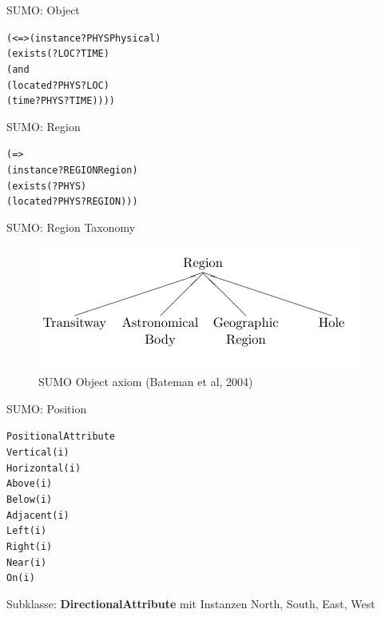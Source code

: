 \documentclass[12pt,a4paper]{beamer}
\begin{document}
\begin{frame}{SUMO: Object}
\begin{alltt}

(<=> (instance ?PHYS Physical)\\
    (exists (?LOC ?TIME)\\
    (and\\
    (located ?PHYS ?LOC)\\
    (time ?PHYS ?TIME))))\\

\end{alltt}

\end{frame}




\begin{frame}{SUMO: Region}
\begin{alltt}
(=>
    (instance ?REGION Region)\\
    (exists (?PHYS)\\
    (located ?PHYS ?REGION)))\\
\end{alltt}
\end{frame}



\begin{frame}{SUMO: Region Taxonomy}
\begin{figure}
\includegraphics[scale=0.45]{img/d2_region_taxonomy.png}
\caption{SUMO Object axiom (Bateman et al, 2004)}
\end{figure}
\end{frame}

\begin{frame}{SUMO: Position}
\begin{alltt}
PositionalAttribute\\
    Vertical(i)\\
    Horizontal(i)\\
    Above(i)\\
    Below(i)\\
    Adjacent(i)\\
    Left(i)\\
    Right(i)\\
    Near(i)\\
    On(i)\\
\end{alltt}
Subklasse: \textbf{DirectionalAttribute} mit Instanzen North, South, East, West
\end{frame}
\end{document}
